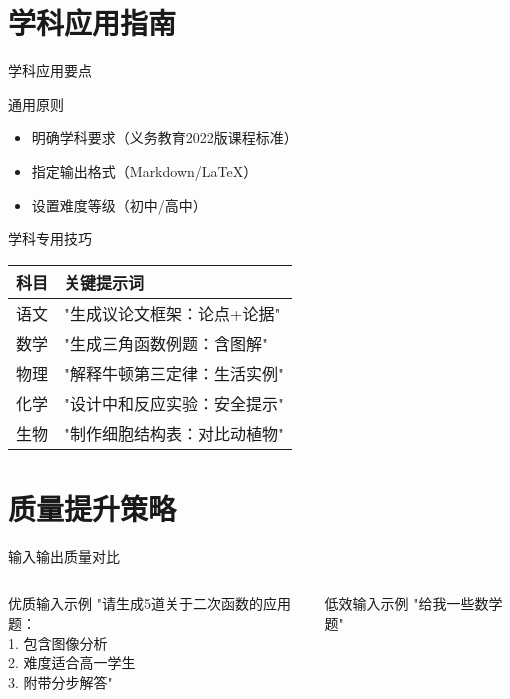 \documentclass{ctexbeamer}
\begin{document}
\section{学科应用指南}
\begin{frame}{学科应用要点}
  \begin{block}{通用原则}
    \begin{itemize}
      \item 明确学科要求（义务教育2022版课程标准）
      \item 指定输出格式（Markdown/LaTeX）
      \item 设置难度等级（初中/高中）
    \end{itemize}
  \end{block}

  \begin{exampleblock}{学科专用技巧}
    \begin{tabular}{ll}
      \toprule
      科目 & 关键提示词 \\
      \midrule
      语文 & "生成议论文框架：论点+论据" \\
      数学 & "生成三角函数例题：含图解" \\
      物理 & "解释牛顿第三定律：生活实例" \\
      化学 & "设计中和反应实验：安全提示" \\
      生物 & "制作细胞结构表：对比动植物" \\
      \bottomrule
    \end{tabular}
  \end{exampleblock}
\end{frame}

\section{质量提升策略}
\begin{frame}[t]{输入输出质量对比}
  \begin{columns}
    \begin{block}{优质输入示例}
      \footnotesize
      "请生成5道关于二次函数的应用题：\\
      1. 包含图像分析\\
      2. 难度适合高一学生\\
      3. 附带分步解答"
    \end{block}

    \begin{alertblock}{低效输入示例}
      \footnotesize
      "给我一些数学题"
    \end{alertblock}
  \end{columns}
\end{frame}
\end{document}
